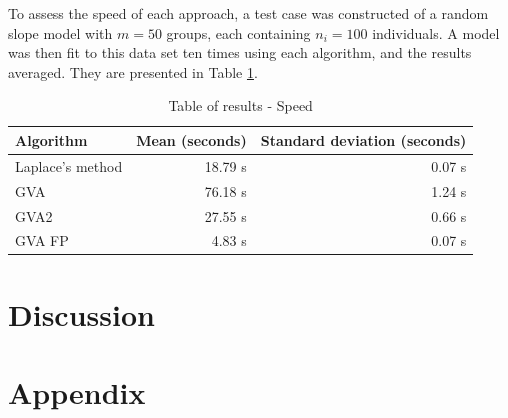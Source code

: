 \documentclass{article}[12pt]
\begin{document}




To assess the speed of each approach, a test case was constructed of a random slope model with $m=50$ groups,
each containing $n_i = 100$ individuals. A model was then fit to this data set ten times using each algorithm,
and the results averaged. They are presented in Table \ref{tab:application_slope_speed}.

\begin{table}
\caption{Table of results - Speed}
\label{tab:application_slope_speed}
\begin{tabular}{|l|rr|}
\hline
Algorithm & Mean (seconds) & Standard deviation (seconds) \\
\hline
Laplace's method & 18.79 s & 0.07 s \\
GVA & 76.18 s & 1.24 s \\
GVA2 & 27.55 s & 0.66 s \\
GVA FP & 4.83 s & 0.07 s \\
\hline
\end{tabular}
\end{table}

\section{Discussion}


\newpage
\section{Appendix} 
\end{document}

